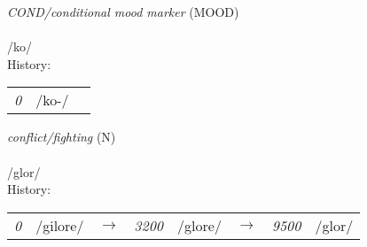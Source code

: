 \vspace{15pt}
\begin{nopagebreak}
 \textit{COND/conditional mood marker} (MOOD)\\
\\
\noindent /k{\textprimstress}o/\\


\noindent History:

\vspace{-0pt}
\hspace{40pt}
\begin{tabular}{ccc}
\textit{0} & /ko-/& \\
\end{tabular}

\vspace{20pt}\hline

\end{nopagebreak}
\filbreak



\vspace{15pt}
\begin{nopagebreak}
 \textit{conflict/fighting} (N)\\
\\
\noindent /gl{\textprimstress}or/\\


\noindent History:

\vspace{-0pt}
\hspace{40pt}
\begin{tabular}{ccc}
\textit{0} & /gilore/&$\rightarrow$ & \textit{3200} & /glore/&$\rightarrow$ & \textit{9500} & /glor/& \\
\end{tabular}

\vspace{20pt}\hline

\end{nopagebreak}
\filbreak



